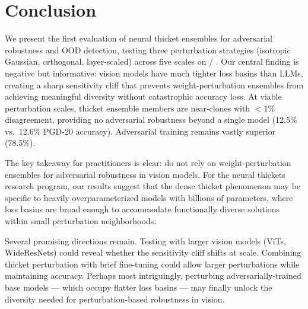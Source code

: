 \section{Conclusion}
\label{sec:conclusion}

We present the first evaluation of neural thicket ensembles for adversarial robustness and OOD detection, testing three perturbation strategies (isotropic Gaussian, orthogonal, layer-scaled) across five scales on \resnet / \cifarten. Our central finding is negative but informative: vision models have much tighter loss basins than LLMs, creating a sharp sensitivity cliff that prevents weight-perturbation ensembles from achieving meaningful diversity without catastrophic accuracy loss. At viable perturbation scales, thicket ensemble members are near-clones with $<$1\% disagreement, providing no adversarial robustness beyond a single model (12.5\% vs.\ 12.6\% PGD-20 accuracy). Adversarial training remains vastly superior (78.5\%).

The key takeaway for practitioners is clear: do not rely on weight-perturbation ensembles for adversarial robustness in vision models. For the neural thickets research program, our results suggest that the dense thicket phenomenon may be specific to heavily overparameterized models with billions of parameters, where loss basins are broad enough to accommodate functionally diverse solutions within small perturbation neighborhoods.

Several promising directions remain. Testing with larger vision models (ViTs, WideResNets) could reveal whether the sensitivity cliff shifts at scale. Combining thicket perturbation with brief fine-tuning could allow larger perturbations while maintaining accuracy. Perhaps most intriguingly, perturbing adversarially-trained base models --- which occupy flatter loss basins \citep{croce2023seasoning} --- may finally unlock the diversity needed for perturbation-based robustness in vision.

